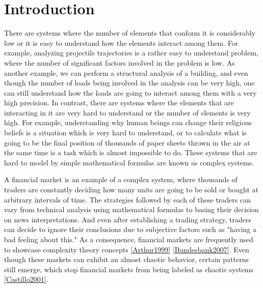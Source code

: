 \chapter{Introduction}
\label{chapter:introduction}


There are systems where the number of elements that conform it is considerably
low or it is easy to understand how the elements interact among them. For
example, analyzing projectile trajectories is a rather easy to understand
problem, where the number of significant factors involved in the problem is
low. As another example, we can perform a structural analysis of a building, and
even though the number of loads being involved in the analysis can be very high,
one can still understand how the loads are going to interact among them with a 
very high precision. In contrast, there are systems where the elements that are
interacting in it are very hard to understand or the number of elements is
very high. For example, understanding why human beings can change their
religious beliefs is a situation which is very hard to understand, or to
calculate what is going to be the final position of thousands of paper sheets
thrown in the air at the same time is a task which is almost impossible to
do. These systems that are hard to model by simple mathematical formulas are
known as complex systems. %

A financial market is an example of a complex system, where thousands of traders
are constantly deciding how many units are going to be sold or bought at
arbitrary intervals of time. The strategies followed by each of these traders
can vary from technical analysis using mathematical formulas to basing their
decision on news interpretations. And even after establishing a trading
strategy, traders can decide to ignore their conclusions due to subjective
factors such as "having a bad feeling about this." As a consequence, financial
markets are frequently used to showcase complexity theory concepts
\ref{Arthur1999} \ref{Bundesbank2007}. Even though these markets can exhibit an
almost chaotic behavior, certain patterns still emerge, which stop financial
markets from being labeled as chaotic systems \ref{Castillo2001}.

